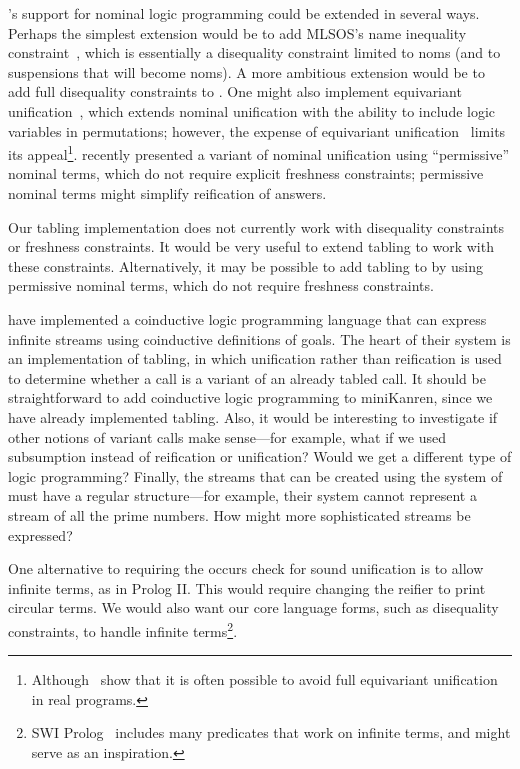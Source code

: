 \alphakanren's support for nominal logic programming could be extended
in several ways.  Perhaps the simplest extension would be to add
MLSOS's name inequality constraint~\cite{lakin2007}, which is
essentially a disequality constraint limited to noms (and to
suspensions that will become noms).  A more ambitious extension would
be to add full disequality constraints to \alphakanren.  One might
also implement equivariant unification~\cite{DBLP:conf/rta/Cheney05},
which extends nominal unification with the ability to include logic
variables in permutations; however, the expense of equivariant
unification~\cite{DBLP:conf/icalp/Cheney04} limits its
appeal\footnote{Although~\citet{DBLP:conf/tlca/UrbanC05} show that it
  is often possible to avoid full equivariant unification in real
  programs.}.  \citet{DowekEtAl} recently presented
a variant of nominal unification using ``permissive'' nominal terms,
which do not require explicit freshness constraints; permissive
nominal terms might simplify reification of \alphakanrensp answers.

Our tabling implementation does not currently work with disequality
constraints or freshness constraints.  It would be very useful to
extend tabling to work with these constraints.  Alternatively, it may
be possible to add tabling to \alphakanrensp by using permissive
nominal terms, which do not require freshness constraints.

\citet{DBLP:conf/iclp/GuptaBMSM07} have implemented a coinductive
logic programming language that can express infinite streams using
coinductive definitions of goals.  The heart of their system is an
implementation of tabling, in which unification rather than
reification is used to determine whether a call is a variant of an
already tabled call.  It should be straightforward to add coinductive
logic programming to miniKanren, since we have already implemented
tabling.  Also, it would be interesting to investigate if other
notions of variant calls make sense---for example, what if we used
subsumption instead of reification or unification? Would we get a
different type of logic programming?  Finally, the streams that can be
created using the system of \citeauthor{DBLP:conf/iclp/GuptaBMSM07}
must have a regular structure---for example, their system cannot
represent a stream of all the prime numbers.  How might more
sophisticated streams be expressed?

One alternative to requiring the occurs check for sound unification is
to allow infinite terms, as in Prolog II. This would require changing
the reifier to print circular terms. We would also want our core
language forms, such as disequality constraints, to handle infinite
terms\footnote{SWI Prolog~\cite{Wielemaker:03b} includes many
  predicates that work on infinite terms, and might serve as an
  inspiration.}.

